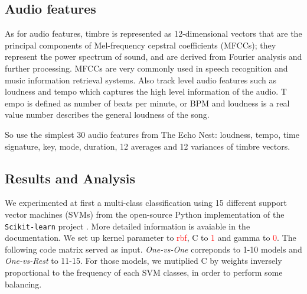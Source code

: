 \documentclass[10pt,twocolumn,letterpaper]{article}
\begin{document}
\subsection{Audio features}

As for audio features, timbre is represented as 12-dimensional vectors that are
the principal components of Mel-frequency cepstral coefficients (MFCCs); they represent the power spectrum of sound, and are derived from
Fourier analysis and further processing. MFCCs are very commonly used in speech
recognition and music information retrieval systems. Also track level audio
features such as loudness and tempo which captures the high level information of the audio. T
empo is defined as number of beats per minute, or BPM and loudness is a real value number describes the general loudness of the song.

So use the simplest 30 audio features from The Echo Nest: loudness,
tempo, time signature, key, mode, duration, 12 averages and 12 variances of timbre
vectors. 

\subsection{Results and Analysis}

We experimented at first a multi-class classification using 15 different support
vector machines (SVMs) from the open-source Python implementation
of the \texttt{Scikit-learn} project \cite{scikit-learn}. More detailed
information is avaiable in the documentation. We set up kernel
parameter to \textcolor{red}{rbf}, C to \textcolor{red}{1} and gamma to
\textcolor{red}{0}. The following code matrix served as input. \emph{One-vs-One} correponds to 1-10 models and \emph{One-vs-Rest} to 11-15.
For those models, we mutiplied C by weights inversely proportional to the frequency of each SVM classes, in order to perform some balancing.
\end{document}
